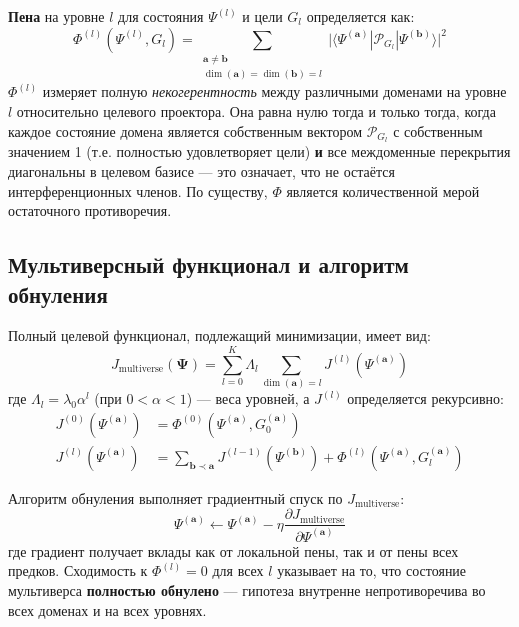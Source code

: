 \documentclass[11pt,a4paper]{article}
\begin{document}
\textbf{Пена} на уровне \(l\) для состояния \(\Psi^{(l)}\) и цели \(G_l\) определяется как:
\begin{equation}
\Phi^{(l)}(\Psi^{(l)}, G_l) = \sum_{\substack{\mathbf{a} \neq \mathbf{b} \\ \dim(\mathbf{a}) = \dim(\mathbf{b}) = l}} \big| \langle \Psi^{(\mathbf{a})} | \mathcal{P}_{G_l} | \Psi^{(\mathbf{b})} \rangle \big|^2
\end{equation}
\(\Phi^{(l)}\) измеряет полную \emph{некогерентность} между различными доменами на уровне \(l\) относительно целевого проектора. Она равна нулю тогда и только тогда, когда каждое состояние домена является собственным вектором \(\mathcal{P}_{G_l}\) с собственным значением 1 (т.е. полностью удовлетворяет цели) \textbf{и} все междоменные перекрытия диагональны в целевом базисе — это означает, что не остаётся интерференционных членов. По существу, \(\Phi\) является количественной мерой остаточного противоречия.

\subsection{Мультиверсный функционал и алгоритм обнуления}

Полный целевой функционал, подлежащий минимизации, имеет вид:
\begin{equation}
J_{\text{multiverse}}(\mathbf{\Psi}) = \sum_{l=0}^{K} \Lambda_l \sum_{\dim(\mathbf{a}) = l} J^{(l)}(\Psi^{(\mathbf{a})})
\end{equation}
где \(\Lambda_l = \lambda_0 \alpha^l\) (при \(0<\alpha<1\)) — веса уровней, а \(J^{(l)}\) определяется рекурсивно:
\begin{align}
J^{(0)}(\Psi^{(\mathbf{a})}) &= \Phi^{(0)}(\Psi^{(\mathbf{a})}, G_0^{(\mathbf{a})}) \\
J^{(l)}(\Psi^{(\mathbf{a})}) &= \sum_{\mathbf{b} \prec \mathbf{a}} J^{(l-1)}(\Psi^{(\mathbf{b})}) + \Phi^{(l)}(\Psi^{(\mathbf{a})}, G_l^{(\mathbf{a})})
\end{align}

Алгоритм обнуления выполняет градиентный спуск по \(J_{\text{multiverse}}\):
\begin{equation}
\Psi^{(\mathbf{a})} \leftarrow \Psi^{(\mathbf{a})} - \eta \frac{\partial J_{\text{multiverse}}}{\partial \Psi^{(\mathbf{a})}}
\end{equation}
где градиент получает вклады как от локальной пены, так и от пены всех предков. Сходимость к \(\Phi^{(l)} = 0\) для всех \(l\) указывает на то, что состояние мультиверса \textbf{полностью обнулено} — гипотеза внутренне непротиворечива во всех доменах и на всех уровнях.
\end{document}
